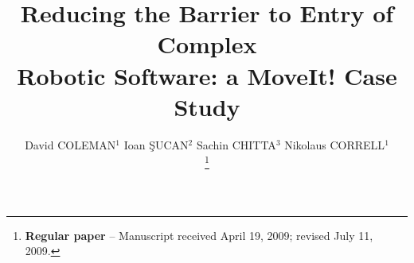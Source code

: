 \documentclass[10pt,journal,compsoc]{joser1}
\begin{document}
\title{Reducing the Barrier to Entry of Complex \\\baselineskip
Robotic Software: a MoveIt! Case Study}

\author{
David COLEMAN$^{1}$
\qquad
Ioan \c{S}UCAN$^{2}$
\qquad
Sachin CHITTA$^{3}$
\qquad
Nikolaus CORRELL$^{1}$

\thanks{{\bf Regular paper} -- Manuscript received April 19, 2009;
revised July 11, 2009.}



} %

\address{
$^1$ Dept. of Computer Science, University of Colorado at Boulder, 430 UCB,
Boulder, CO 80309\\
$^2$ Google Inc., 1600 Amphitheatre Parkway, Mountain View, CA 94043\\
$^3$ SRI International, 333 Ravenswood Avenue, Menlo Park, CA 94025
}


\markboth
\end{document}
